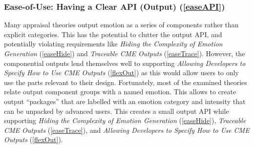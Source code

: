 \subsubsection{Ease-of-Use: Having a Clear API (Output) (\ref{easeAPI})}
Many appraisal theories output emotion as a series of components rather than
explicit categories. This has the potential to clutter the output API, and
potentially violating requirements like \textit{Hiding the Complexity of
    Emotion Generation} (\ref{easeHide}) and \textit{Traceable CME Outputs}
(\ref{easeTrace}). However, the componential outputs lend themselves well to
supporting \textit{Allowing Developers to Specify How to Use CME Outputs}
(\ref{flexOut}) as this would allow users to only use the parts relevant to
their design. Fortunately, most of the examined theories relate output
component groups with a named emotion. This allows \progname{} to create output
``packages'' that are labelled with an emotion category and intensity that can
be unpacked by advanced users. This creates a small output API while supporting
\textit{Hiding the Complexity of Emotion Generation} (\ref{easeHide}),
\textit{Traceable CME Outputs} (\ref{easeTrace}), and \textit{Allowing
    Developers to Specify How to Use CME Outputs} (\ref{flexOut}).

